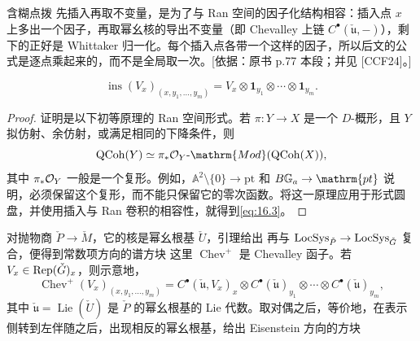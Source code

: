 \begin{transnote}{含糊点拨}
先插入再取不变量，是为了与 Ran 空间的因子化结构相容：插入点 $x$ 上多出一个因子，再取幂幺核的导出不变量（即 Chevalley 上链 $C^{\bullet}(\check{\mathfrak u},-)$），剩下的正好是 Whittaker 归一化。每个插入点各带一个这样的因子，所以后文的公式是逐点乘起来的，而不是全局取一次。[依据：原书 p.77 本段；并见 [CCF24]。]
\end{transnote}
\[\operatorname{ins}(V_x)_{(x,y_1,\ldots,y_m)}=V_x\otimes\mathbf1_{y_1}\otimes\cdots\otimes\mathbf1_{y_m}.\]
\begin{proof}
证明是以下初等原理的 Ran 空间形式。若 $\pi:Y\to X$ 是一个 $D$-概形，且 $Y$ 拟仿射、余仿射，或满足相同的下降条件，则
\[\QCoh(Y)\simeq\pi_*\cO_Y\text{-}\mathrm{Mod}(\QCoh(X)),\]
其中 $\pi_*\mathcal{O}_Y$ 一般是一个复形。例如，$\mathbb A^2\setminus\{0\}\to\mathrm{pt}$ 和 $B\Ga\to\mathrm{pt}$ 说明，必须保留这个复形，而不能只保留它的零次函数。将这一原理应用于形式圆盘，并使用插入与 Ran 卷积的相容性，就得到\eqref{eq:16.3}。
\end{proof}

对抛物商 $\check P\to\check M$，它的核是幂幺根基 $\check U$，引理给出
再与 $\operatorname{LocSys}_{\check P}\to\operatorname{LocSys}_{\check{G}}$ 复合，便得到常数项方向的谱方块
这里 $\operatorname{Chev}^+$ 是 Chevalley 函子。若 $V_x\in\operatorname{Rep}(\check{G})_x$，则示意地，
\[\operatorname{Chev}^+(V_x)_{(x,y_1,\ldots,y_m)}=
C^\bullet(\check{\mathfrak u},V_x)_x\otimes C^\bullet(\check{\mathfrak u})_{y_1}\otimes\cdots\otimes C^\bullet(\check{\mathfrak u})_{y_m},\]
其中 $\check{\mathfrak u}=\operatorname{Lie}(\check U)$ 是 $\check P$ 的幂幺根基的 Lie 代数。取对偶之后，等价地，在表示侧转到左伴随之后，出现相反的幂幺根基，给出 Eisenstein 方向的方块

